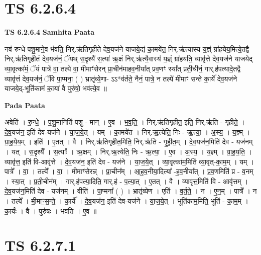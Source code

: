 \documentclass[17pt]{extarticle}
\begin{document}

\section{ TS 6.2.6.4 }

\textbf{TS 6.2.6.4 } \newline
\textbf{Samhita Paata} \newline

नव॑ रुन्धे पशु॒माने॒व भ॑वति॒ निर्.ऋ॑तिगृहीते देव॒यज॑ने याजये॒द्यं का॒मये॑त॒ निर्.ऋ॑त्यास्य य॒ज्ञ्ं ग्रा॑हयेय॒मित्ये॒तद्वै निर्.ऋ॑तिगृहीतं देव॒यज॑नं॒ ॅयथ् स॒दृश्यै॑ स॒त्या॑ ऋ॒क्षं निर्.ऋ॑त्यै॒वास्य॑ य॒ज्ञ्ं ग्रा॑हयति॒ व्यावृ॑त्ते देव॒यज॑ने याजयेद् व्या॒वृत्का॑मं॒ ॅयं पात्रे॑ वा॒ तल्पे॑ वा॒ मीमाꣳ॑सेरन् प्रा॒चीन॑माहव॒नीया᳚त् प्रव॒णꣳ स्या᳚त् प्रती॒चीनं॒ गार्.ह॑पत्यादे॒तद्वै व्यावृ॑त्तं देव॒यज॑नं॒ ॅवि पा॒प्मना॒ ( ) भ्रातृ॑व्ये॒णा- ऽऽ*व॑र्तते॒ नैनं॒ पात्रे॒ न तल्पे॑ मीमाꣳ सन्ते का॒र्ये॑ देव॒यज॑ने याजये॒द्-भूति॑कामं का॒या॑ वै पुरु॑षो॒ भव॑त्ये॒व ॥ \newline

\textbf{Pada Paata} \newline

अवेति॑ । रु॒न्धे॒ । प॒शु॒मानिति॑ पशु - मान् । ए॒व । भ॒व॒ति॒ । निर्.ऋ॑तिगृहीत॒ इति॒ निर्.ऋ॑ति - गृ॒ही॒ते॒ । दे॒व॒यज॑न॒ इति॑ देव-यज॑ने । या॒ज॒ये॒त् । यम् । का॒मये॑त । निर्.ऋ॒त्येति॒ निः - ऋ॒त्या॒ । अ॒स्य॒ । य॒ज्ञ्म् । ग्रा॒ह॒ये॒य॒म् । इति॑ । ए॒तत् । वै । निर्.ऋ॑तिगृहीत॒मिति॒ निर्.ऋ॑ति - गृ॒ही॒त॒म् । दे॒व॒यज॑न॒मिति॑ देव - यज॑नम् । यत् । स॒दृश्यै᳚ । स॒त्याः᳚ । ऋ॒क्षम् । निर्.ऋ॒त्येति॒ निः - ऋ॒त्या॒ । ए॒व । अ॒स्य॒ । य॒ज्ञ्म् । ग्रा॒ह॒य॒ति॒ । व्यावृ॑त्त॒ इति॑ वि-आवृ॑त्ते । दे॒व॒यज॑न॒ इति॑ देव - यज॑ने । या॒ज॒ये॒त् । व्या॒वृत्का॑म॒मिति॑ व्या॒वृत्-का॒म॒म् । यम् । पात्रे᳚ । वा॒ । तल्पे᳚ । वा॒ । मीमाꣳ॑सेरन्न् । प्रा॒चीन᳚म् । आ॒ह॒व॒नीया॒दित्या᳚ -ह॒व॒नीया᳚त् । प्र॒व॒णमिति॑ प्र - व॒नम् । स्या॒त् । प्र॒ती॒चीन᳚म् । गार्.ह॑पत्या॒दिति॒ गार्.ह॑ - प॒त्या॒त् । ए॒तत् । वै । व्यावृ॑त्त॒मिति॑ वि - आवृ॑त्तम् । दे॒व॒यज॑न॒मिति॑ देव - यज॑नम् । वीति॑ । पा॒प्मना᳚ ( ) । भ्रातृ॑व्येण । एति॑ । व॒र्त॒ते॒ । न । ए॒न॒म् । पात्रे᳚ । न । तल्पे᳚ । मी॒माꣳ॒॒स॒न्ते॒ । का॒र्ये᳚ । दे॒व॒यज॑न॒ इति॑ देव-यज॑ने । या॒ज॒ये॒त् । भूति॑काम॒मिति॒ भूति॑ - का॒म॒म् । का॒र्यः॑ । वै । पुरु॑षः । भव॑ति । ए॒व ॥  \newline





\section{ TS 6.2.7.1 }
\end{document}
